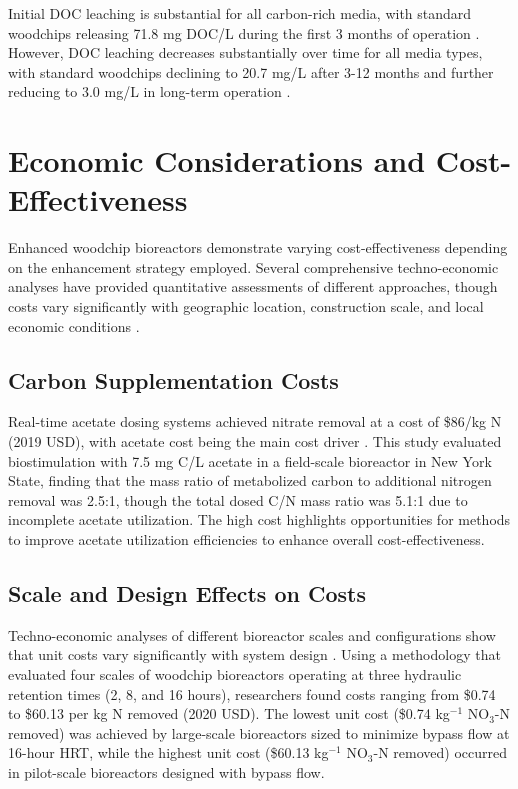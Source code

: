 \documentclass[12pt,a4paper]{article}
\begin{document}
Initial DOC leaching is substantial for all carbon-rich media, with standard woodchips releasing 71.8 mg DOC/L during the first 3 months of operation \citep{RN291}. However, DOC leaching decreases substantially over time for all media types, with standard woodchips declining to 20.7 mg/L after 3-12 months and further reducing to 3.0 mg/L in long-term operation \citep{RN291}.

\section{Economic Considerations and Cost-Effectiveness}

Enhanced woodchip bioreactors demonstrate varying cost-effectiveness depending on the enhancement strategy employed. Several comprehensive techno-economic analyses have provided quantitative assessments of different approaches, though costs vary significantly with geographic location, construction scale, and local economic conditions \citep{RN348, RN605}.

\subsection{Carbon Supplementation Costs}

Real-time acetate dosing systems achieved nitrate removal at a cost of \$86/kg N (2019 USD), with acetate cost being the main cost driver \citep{RN196}. This study evaluated biostimulation with 7.5 mg C/L acetate in a field-scale bioreactor in New York State, finding that the mass ratio of metabolized carbon to additional nitrogen removal was 2.5:1, though the total dosed C/N mass ratio was 5.1:1 due to incomplete acetate utilization. The high cost highlights opportunities for methods to improve acetate utilization efficiencies to enhance overall cost-effectiveness.

\subsection{Scale and Design Effects on Costs}

Techno-economic analyses of different bioreactor scales and configurations show that unit costs vary significantly with system design \citep{RN348}. Using a methodology that evaluated four scales of woodchip bioreactors operating at three hydraulic retention times (2, 8, and 16 hours), researchers found costs ranging from \$0.74 to \$60.13 per kg N removed (2020 USD). The lowest unit cost (\$0.74 kg$^{-1}$ NO$_3$-N removed) was achieved by large-scale bioreactors sized to minimize bypass flow at 16-hour HRT, while the highest unit cost (\$60.13 kg$^{-1}$ NO$_3$-N removed) occurred in pilot-scale bioreactors designed with bypass flow.
\end{document}
